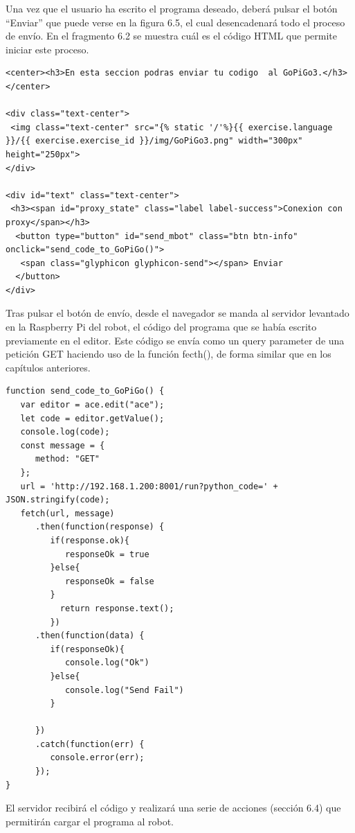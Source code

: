 \documentclass{report}
\begin{document}
Una vez que el usuario ha escrito el programa deseado, deberá pulsar el botón “Enviar” que puede verse en la figura 6.5, el cual desencadenará todo el proceso de envío. En el fragmento 6.2 se muestra cuál es el código HTML que permite iniciar este proceso.
\\
\begin{lstlisting}[frame=single,breaklines=true, label=Sección para el envió, caption=Sección para el envió,  captionpos=b]
<center><h3>En esta seccion podras enviar tu codigo  al GoPiGo3.</h3></center>

<div class="text-center">
 <img class="text-center" src="{% static '/'%}{{ exercise.language }}/{{ exercise.exercise_id }}/img/GoPiGo3.png" width="300px" height="250px">
</div>

<div id="text" class="text-center">
 <h3><span id="proxy_state" class="label label-success">Conexion con proxy</span></h3>
  <button type="button" id="send_mbot" class="btn btn-info" onclick="send_code_to_GoPiGo()">
   <span class="glyphicon glyphicon-send"></span> Enviar
  </button>
</div>
\end{lstlisting}
Tras pulsar el botón de envío, desde el navegador se manda al servidor levantado en la Raspberry Pi del robot, el código del programa que se había escrito previamente en el editor. Este código se envía como un query parameter de una petición GET haciendo uso de la función fecth(), de forma similar que en los capítulos anteriores.
\\
\begin{lstlisting}[frame=single,breaklines=true, label=Función de envío al servidor del GoPiGo3, caption=Función de envío al servidor del GoPiGo3,  captionpos=b]
function send_code_to_GoPiGo() {
   var editor = ace.edit("ace");
   let code = editor.getValue();
   console.log(code);
   const message = {
      method: "GET"
   };
   url = 'http://192.168.1.200:8001/run?python_code=' + JSON.stringify(code);
   fetch(url, message)
      .then(function(response) {
         if(response.ok){
            responseOk = true
         }else{
            responseOk = false
         }
           return response.text();
         })
      .then(function(data) {
         if(responseOk){
            console.log("Ok")
         }else{
            console.log("Send Fail")
         }

      })
      .catch(function(err) {
         console.error(err);
      });
}
\end{lstlisting}
El servidor recibirá el código y realizará una serie de acciones (sección 6.4) que permitirán cargar el programa al robot.
\end{document}
